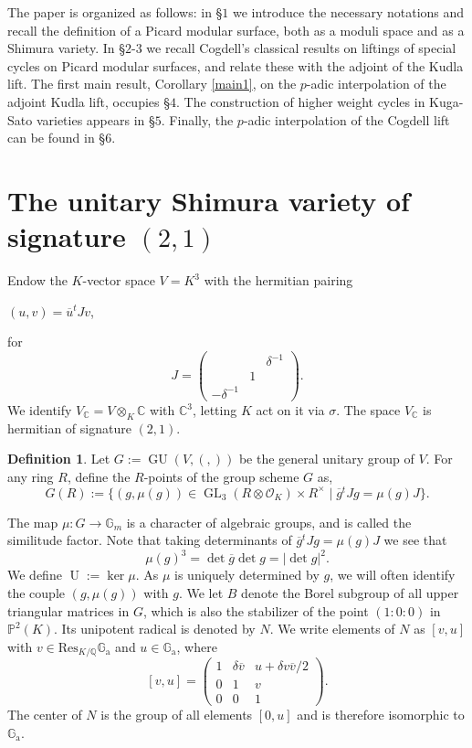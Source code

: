 \documentclass[12pt,a4paper,reqno]{amsart}
\theoremstyle{definition}
\newtheorem{definition}{Definition}
\numberwithin{definition}{subsection}
\theoremstyle{definition}
\numberwithin{Definition}{subsection}
\theoremstyle{remark}
\theoremstyle{remark}
\numberwithin{Remark}{subsection}
\theoremstyle{remark}
\theoremstyle{plain}
\numberwithin{Theorem}{subsection}
\theoremstyle{plain}
\theoremstyle{plain}
\theoremstyle{plain}
\theoremstyle{plain}
\theoremstyle{plain}
\theoremstyle{plain}
\theoremstyle{plain}
\newcommand*{\Q}{\mathbb{Q}}
\newcommand*{\Cc}{\mathbb{C}}
\newcommand*{\Gg}{\mathbb{G}}
\DeclareMathOperator{\GL}{GL}
\DeclareMathOperator{\GU}{GU}
\DeclareMathOperator{\U}{U}
\begin{document}
The paper is organized as follows: in \S$1$ we introduce the necessary notations and recall the definition of a Picard modular surface, both as a moduli space and as a Shimura variety. In \S$2$-$3$ we recall Cogdell's classical results on liftings of special cycles on Picard modular surfaces, and relate these with the adjoint of the Kudla lift. The first main result, Corollary \ref{main1}, on the $p$-adic interpolation of the adjoint Kudla lift, occupies \S$4$. The construction of higher weight cycles in Kuga-Sato varieties appears in \S$5$. Finally, the $p$-adic interpolation of the Cogdell lift can be found in \S$6$.
\section{The unitary Shimura variety of signature $(2,1)$}
Endow the $K$-vector space $V=K^3$ with the hermitian pairing
\begin{center}
    $(u,v)=\overline{u}^tJ v$,
\end{center}
for 
\[
J=\begin{pmatrix}& & \delta^{-1}\\
    & 1 & \\
    -\delta^{-1} & &\end{pmatrix}.
\]
We identify $V_\Cc=V\otimes_{K} \Cc$ with $\Cc^3$, letting $K$ act on it via $\sigma$. The space $V_\Cc$ is hermitian of signature $(2,1)$. %
\begin{definition}
Let $G:=\GU(V,(,))$ be the general unitary group of $V$. For any ring $R$, define the $R$-points of the group scheme $G$ as,
\[
G(R):=\{(g,\mu(g))\in \GL_3(R\otimes\mathcal{O}_K) \times R^\times \mid \overline{g}{^t}Jg =\mu(g) J\}.
\]
\end{definition}
\noindent The map $\mu:G\to \mathbb{G}_m$ is a character of algebraic groups, and is called the similitude factor. Note that taking determinants of $\overline{g}{^t}Jg=\mu(g)J$ we see that 
\[
\mu(g)^3=\det \overline{g}\det g=|\det g|^2.
\]
We define $\U:=\ker \mu$. As $\mu$ is uniquely determined by $g$, we will often identify the couple $(g,\mu(g))$ with $g$. We let $B$ denote the Borel subgroup of all upper triangular matrices in $G$, which is also the stabilizer of the point $(1:0:0)$ in $\mathbb{P}^2(K)$. Its unipotent radical is denoted by $N$. We write elements of $N$ as $[v,u]$ with $v\in \text{Res}_{K/\Q}\Gg_{\text{a}}$ and $u\in \Gg_{\text{a}}$, where
\[
[v,u]=\begin{pmatrix}
1&\delta\overline{v}&u+\delta v\overline{v}/2\\
0&1&v\\
0&0&1
\end{pmatrix}.
\]
The center of $N$ is the group of all elements $[0,u]$ and is therefore isomorphic to $\Gg_{\text{a}}$.
\end{document}
